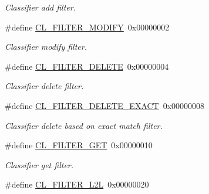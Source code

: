 \begin{DoxyCompactItemize}
\begin{DoxyCompactList}\small\item\em Classifier add filter. \end{DoxyCompactList}\item 
\hypertarget{group__FAPI__QOS__CLASS_gafdfbe09ca8caf42dbc84ed653aeaac60}{\#define \hyperlink{group__FAPI__QOS__CLASS_gafdfbe09ca8caf42dbc84ed653aeaac60}{C\-L\-\_\-\-F\-I\-L\-T\-E\-R\-\_\-\-M\-O\-D\-I\-F\-Y}~0x00000002}\label{group__FAPI__QOS__CLASS_gafdfbe09ca8caf42dbc84ed653aeaac60}

\begin{DoxyCompactList}\small\item\em Classifier modify filter. \end{DoxyCompactList}\item 
\hypertarget{group__FAPI__QOS__CLASS_gac84c68beb8c3aaa01c9b1c0ac7b705ef}{\#define \hyperlink{group__FAPI__QOS__CLASS_gac84c68beb8c3aaa01c9b1c0ac7b705ef}{C\-L\-\_\-\-F\-I\-L\-T\-E\-R\-\_\-\-D\-E\-L\-E\-T\-E}~0x00000004}\label{group__FAPI__QOS__CLASS_gac84c68beb8c3aaa01c9b1c0ac7b705ef}

\begin{DoxyCompactList}\small\item\em Classifier delete filter. \end{DoxyCompactList}\item 
\hypertarget{group__FAPI__QOS__CLASS_ga5e8a126e56a23d62244de2060d85af26}{\#define \hyperlink{group__FAPI__QOS__CLASS_ga5e8a126e56a23d62244de2060d85af26}{C\-L\-\_\-\-F\-I\-L\-T\-E\-R\-\_\-\-D\-E\-L\-E\-T\-E\-\_\-\-E\-X\-A\-C\-T}~0x00000008}\label{group__FAPI__QOS__CLASS_ga5e8a126e56a23d62244de2060d85af26}

\begin{DoxyCompactList}\small\item\em Classifier delete based on exact match filter. \end{DoxyCompactList}\item 
\hypertarget{group__FAPI__QOS__CLASS_gac47fb4e6357cbd771dae481fe0857c7f}{\#define \hyperlink{group__FAPI__QOS__CLASS_gac47fb4e6357cbd771dae481fe0857c7f}{C\-L\-\_\-\-F\-I\-L\-T\-E\-R\-\_\-\-G\-E\-T}~0x00000010}\label{group__FAPI__QOS__CLASS_gac47fb4e6357cbd771dae481fe0857c7f}

\begin{DoxyCompactList}\small\item\em Classifier get filter. \end{DoxyCompactList}\item 
\hypertarget{group__FAPI__QOS__CLASS_ga185fa2bd20155e1e60216d6779fb7f89}{\#define \hyperlink{group__FAPI__QOS__CLASS_ga185fa2bd20155e1e60216d6779fb7f89}{C\-L\-\_\-\-F\-I\-L\-T\-E\-R\-\_\-\-L2\-L}~0x00000020}\label{group__FAPI__QOS__CLASS_ga185fa2bd20155e1e60216d6779fb7f89}


\end{DoxyCompactItemize}
